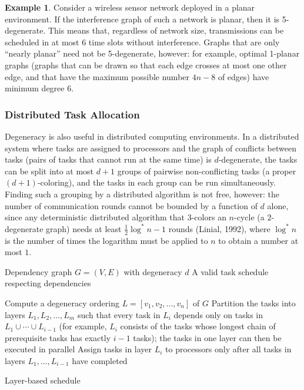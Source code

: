 \documentclass{article}
\theoremstyle{definition}
\newtheorem{example}{Example}
\begin{document}
\begin{example}

Consider a wireless sensor network deployed in a planar environment. If the interference graph of such a network is planar, then it is 5-degenerate. This means that, regardless of network size, transmissions can be scheduled in at most 6 time slots without interference. Graphs that are only ``nearly planar'' need not be 5-degenerate, however: for example, optimal 1-planar graphs (graphs that can be drawn so that each edge crosses at most one other edge, and that have the maximum possible number $4n-8$ of edges) have minimum degree 6.
\end{example}

\subsubsection*{Distributed Task Allocation}

Degeneracy is also useful in distributed computing environments. In a distributed system where tasks are assigned to processors and the graph of conflicts between tasks (pairs of tasks that cannot run at the same time) is $d$-degenerate, the tasks can be split into at most $d+1$ groups of pairwise non-conflicting tasks (a proper $(d+1)$-coloring), and the tasks in each group can be run simultaneously. Finding such a grouping by a distributed algorithm is not free, however: the number of communication rounds cannot be bounded by a function of $d$ alone, since any deterministic distributed algorithm that $3$-colors an $n$-cycle (a $2$-degenerate graph) needs at least $\frac{1}{2}\log^* n - 1$ rounds (Linial, 1992), where $\log^* n$ is the number of times the logarithm must be applied to $n$ to obtain a number at most $1$.

\begin{algorithm}
\caption{Distributed Task Scheduling for $d$-degenerate Dependency Graphs}
\label{alg:distributed-scheduling}
\begin{algorithmic}[1]
    \Require Dependency graph $G = (V, E)$ with degeneracy $d$
    \Ensure A valid task schedule respecting dependencies
    
    \State Compute a degeneracy ordering $L = [v_1, v_2, \ldots, v_n]$ of $G$
    \State Partition the tasks into layers $L_1, L_2, \ldots, L_m$ such that every task in $L_i$ depends only on tasks in $L_1 \cup \cdots \cup L_{i-1}$ (for example, $L_i$ consists of the tasks whose longest chain of prerequisite tasks has exactly $i-1$ tasks); the tasks in one layer can then be executed in parallel
    \State Assign tasks in layer $L_i$ to processors only after all tasks in layers $L_1, \ldots, L_{i-1}$ have completed
    
    \State \Return Layer-based schedule
\end{algorithmic}
\end{algorithm}
\end{document}
